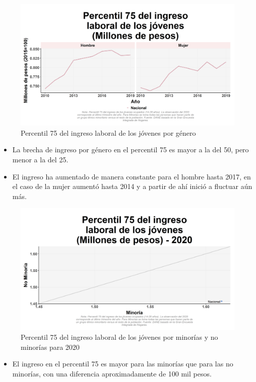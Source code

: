     \begin{figure}[H]
        \caption{Percentil 75 del ingreso laboral de los jóvenes por género \label{map_result_2} }
        \begin{center}
        \includegraphics[width=\textwidth,keepaspectratio]{img/var_32_trend.png}
        \end{center}
    \end{figure}
            \begin{itemize}
                \item La brecha de ingreso por género en el percentil 75 es mayor a la del 50, pero menor a la del 25.
                \item El ingreso ha aumentado de manera constante para el hombre hasta 2017, en el caso de la mujer aumentó hasta 2014 y a partir de ahí inició a fluctuar aún más.
                \end{itemize}

    \begin{figure}[H]
        \caption{Percentil 75 del ingreso laboral de los jóvenes por minorías y no minorías para 2020 \label{map_result_2} }
        \begin{center}
        \includegraphics[width=\textwidth,keepaspectratio]{img/var_31_scatter.png}
        \end{center}
    \end{figure}
            \begin{itemize}
                \item El ingreso en el percentil 75 es mayor para las minorías que para las no minorías, con una diferencia aproximadamente de 100 mil pesos.
                \end{itemize}

